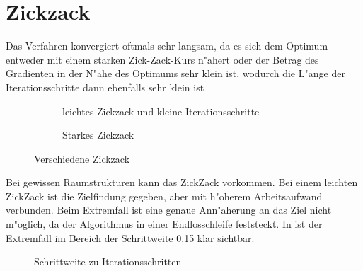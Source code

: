 \section{Zickzack}
Das Verfahren konvergiert oftmals sehr langsam, da es sich dem Optimum
entweder mit einem starken Zick-Zack-Kurs n"ahert oder der Betrag des
Gradienten in der N"ahe des Optimums sehr klein ist, wodurch die L"ange
der Iterationsschritte dann ebenfalls sehr klein ist

\begin{figure}[htb]
\centering
\begin{subfigure}[b]{0.49\textwidth}
\centering
\caption{leichtes Zickzack und kleine Iterationsschritte}
\end{subfigure} \begin{subfigure}[b]{0.49\textwidth}
\centering
\caption{Starkes Zickzack}\label{zickzackb}
\end{subfigure}
\caption{Verschiedene Zickzack}\label{zickzack}
\end{figure}

Bei gewissen Raumstrukturen kann das ZickZack vorkommen. Bei einem
leichten ZickZack ist die Zielfindung gegeben, aber mit h"oherem
Arbeitsaufwand verbunden.
Beim Extremfall ist eine genaue Ann"aherung an das Ziel nicht m"oglich,
da der Algorithmus in einer Endlosschleife feststeckt.
In  ist der Extremfall im Bereich der Schrittweite 0.15
klar sichtbar.

\begin{figure}
\centering
\caption{Schrittweite zu Iterationsschritten}\label{s_vs_i}
\end{figure}


